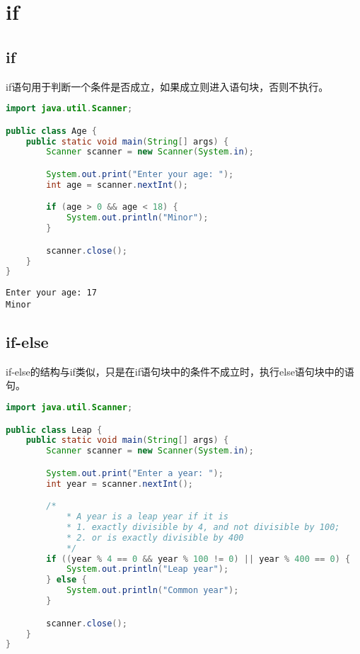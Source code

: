 \newpage

\section{if}

\subsection{if}

if语句用于判断一个条件是否成立，如果成立则进入语句块，否则不执行。\\


\begin{lstlisting}[language=Java]
import java.util.Scanner;

public class Age {
	public static void main(String[] args) {
		Scanner scanner = new Scanner(System.in);

		System.out.print("Enter your age: ");
		int age = scanner.nextInt();

		if (age > 0 && age < 18) {
			System.out.println("Minor");
		}

		scanner.close();
	}
}
\end{lstlisting}

\begin{tcolorbox}
	\begin{verbatim}
Enter your age: 17
Minor
\end{verbatim}
\end{tcolorbox}

\vspace{0.5cm}

\subsection{if-else}

if-else的结构与if类似，只是在if语句块中的条件不成立时，执行else语句块中的语句。\\


\begin{lstlisting}[language=Java]
import java.util.Scanner;

public class Leap {
	public static void main(String[] args) {
		Scanner scanner = new Scanner(System.in);

		System.out.print("Enter a year: ");
		int year = scanner.nextInt();

		/*
			* A year is a leap year if it is
			* 1. exactly divisible by 4, and not divisible by 100;
			* 2. or is exactly divisible by 400
			*/
		if ((year % 4 == 0 && year % 100 != 0) || year % 400 == 0) {
			System.out.println("Leap year");
		} else {
			System.out.println("Common year");
		}

		scanner.close();
	}
}
\end{lstlisting}

